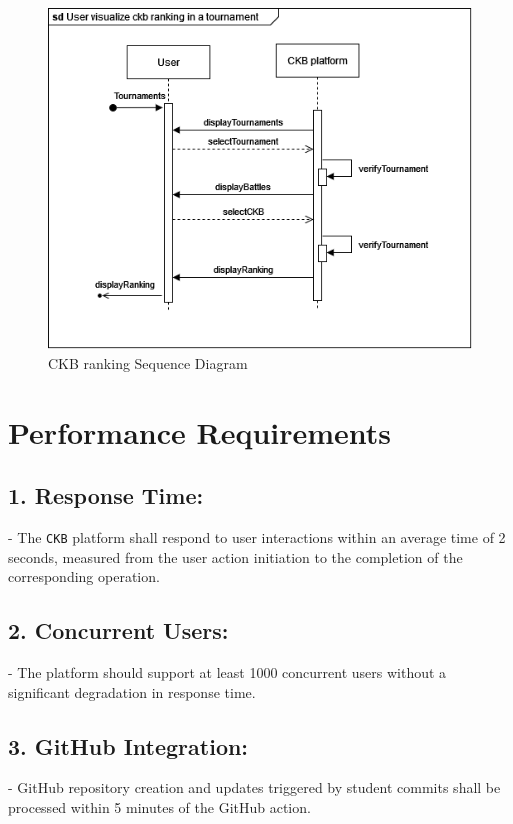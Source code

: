 \begin{center}
    \begin{figure} [H]
        \begin{center}
            \includegraphics[width=0.9\linewidth]{Images/SequenceDiagrams/SD_19.png}
            \caption{CKB ranking Sequence Diagram}
            \label{fig: ckb_ranking_seq_diag}
        \end{center}
    \end{figure}
\end{center}


\section{Performance Requirements}
\label{subsec:performance_requirements}%

\subsection*{1. Response Time:}
   - The \verb|CKB| platform shall respond to user interactions within an average time of 2 seconds, measured from the user action initiation to the completion of the corresponding operation.

\subsection*{2. Concurrent Users:}
   - The platform should support at least 1000 concurrent users without a significant degradation in response time.

\subsection*{3. GitHub Integration:}
   - GitHub repository creation and updates triggered by student commits shall be processed within 5 minutes of the GitHub action.

